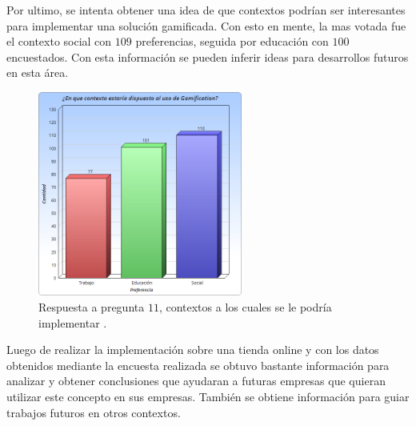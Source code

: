 Por ultimo, se intenta obtener una idea de que contextos podrían ser interesantes para implementar una
solución gamificada. Con esto en mente, la mas votada fue el contexto social con $109$ preferencias,
seguida por educación con $100$ encuestados. Con esta información se pueden inferir ideas para
desarrollos futuros en esta área.

\begin{figure}[!htb]
  \centering
  \includegraphics[width=0.6\textwidth]{images/Graficos/graf_5_12.png}
  \caption[chart5.12]{Respuesta a pregunta $11$, contextos a los cuales se le podría implementar {\GAM}.}
  \label{fig:chart5.12}
\end{figure}


Luego de realizar la implementación {\GAM} sobre una tienda online y con los datos obtenidos mediante
la encuesta realizada se obtuvo bastante información para analizar y obtener conclusiones que ayudaran
a futuras empresas que quieran utilizar este concepto en sus empresas. También se obtiene información
para guiar trabajos futuros en otros contextos.
